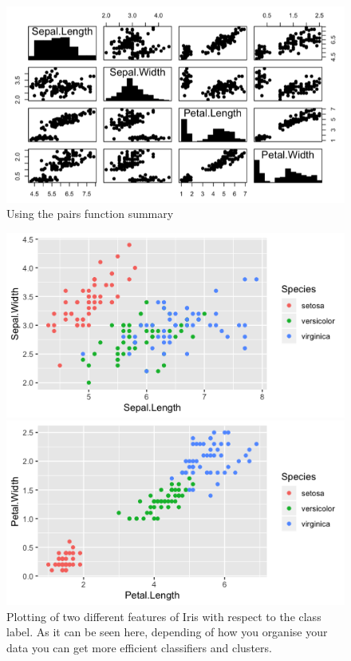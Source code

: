 \begin{figure}[H]
	\centering
	\includegraphics[width=13cm]{Figuras_tfg/Figure_Iris_Histogram}
	\caption{Using the pairs function summary}
	\label{fig:figure_pairs_iris}
\end{figure}

\begin{figure}[H]
\begin{minipage}{.5\textwidth}
        \includegraphics[scale=.54]{Figuras_tfg/R_plot_iris_knn_width_sepal}
 \end{minipage}%
 \begin{minipage}{.5\textwidth}
        \begin{flushright}
               \includegraphics[scale=.54]{Figuras_tfg/R_plot_knn_petal}  
        \end{flushright} 
    \end{minipage}  
  \caption{Plotting of two different features of Iris with respect to the class label. As it can be seen here, depending of how you organise your data you can get more efficient classifiers and clusters. }
 \label{fig:figure_knn_classifier}
\end{figure} 

